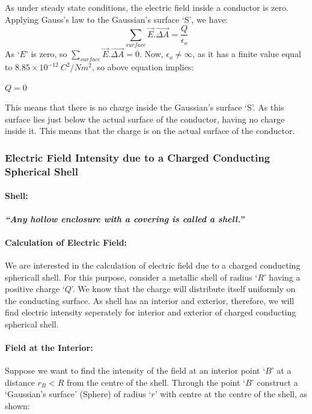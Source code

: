 As under steady state conditions,
the electric field inside a conductor is zero. Applying Gauss’s law to
the Gaussian’s surface `S’, 
we have:
\begin{equation}\label{eq:11.24}
 \sum_{surface} \vec{E}.\vec{\Delta A}  = \frac{Q}{\epsilon_{o}}
\end{equation}
As `$E$’ is zero, so $\sum_{surface} \vec{E}.\vec{\Delta A} = 0$. Now, $\epsilon_{o} \neq \infty$,
as it has a finite value equal to $8.85\times 10^{-12}\:C^{2}/Nm^{2}$,
so above equation implies:
\begin{center}
  $Q=0$
\end{center}
This means that there is no charge inside the Gaussian’s surface `S'.
As this surface lies just below the actual surface of the conductor,
having no charge inside it.
This means that the charge is on the actual surface of the conductor.

\subsubsection{Electric Field Intensity due to a Charged Conducting Spherical Shell}
\paragraph{Shell:}\textbf{\textit{“Any hollow enclosure with a covering is called a shell.”}}
\paragraph{Calculation of Electric Field:}
We are interested in the calculation of electric field due to a
charged conducting sphericall shell. For this purpose,
consider a metallic shell of radius `$R$’ having a positive charge `$Q$’.
We know that the charge will distribute itself uniformly on the
conducting surface. As shell has an interior and exterior,
therefore, we will find electric intensity seperately for
interior and exterior of charged conducting spherical shell.
\paragraph{Field at the Interior:}
Suppose we want to find the intensity of the field at an interior
point `$B$’ at a distance $r_{B} < R$ from the centre of the shell.
Through the point `$B$’ construct a `Gaussian’s surface’ (Sphere)
of radius `$r$’ with centre at the centre of the shell, as shown:


